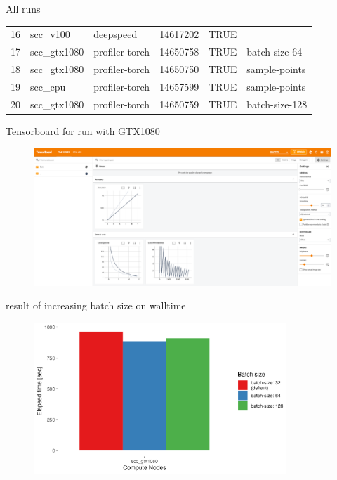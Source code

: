 \documentclass[compress,aspectratio=169]{beamer}
\begin{document}
\begin{frame}{All runs}
{\begin{table}[]
\begin{tabular}{@{}llllll@{}}
16  & scc\_v100    & deepspeed      & 14617202 & TRUE      &                \\
17  & scc\_gtx1080 & profiler-torch & 14650758 & TRUE      & batch-size-64  \\
18  & scc\_gtx1080 & profiler-torch & 14650750 & TRUE      & sample-points  \\
19  & scc\_cpu     & profiler-torch & 14657599 & TRUE      & sample-points  \\
20  & scc\_gtx1080 & profiler-torch & 14650759 & TRUE      & batch-size-128 \\ \bottomrule
\end{tabular}
\end{table}
}
\end{frame}

\begin{frame}{Tensorboard for run with GTX1080}

\begin{center}
    \begin{figure}
        \includegraphics[width=1\textwidth]{../../data/scap_gtx1080_tensorboard_14615343}
    \end{figure}
    \end{center}

\end{frame}

\begin{frame}{result of increasing batch size on walltime}
    \vspace{-1em}
    \begin{center}
        \begin{figure}
            \includegraphics[width=0.85\textwidth]{../../data/sacct_barplot_by_nodes_batch-size-effect}

        \end{figure}
    \end{center}
\end{frame}
\end{document}
